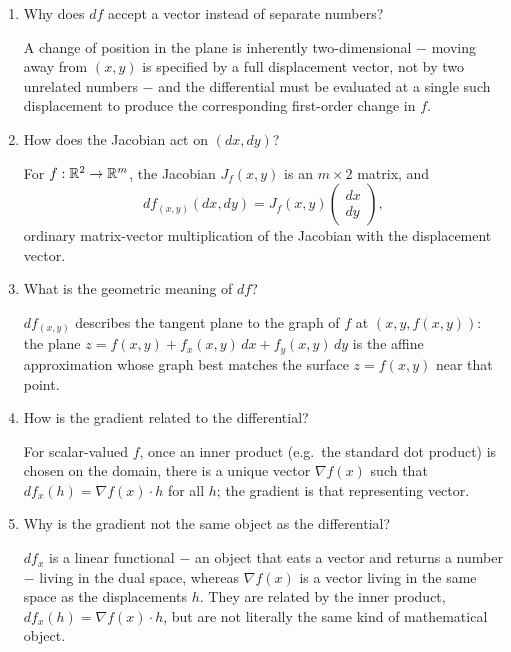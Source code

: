 \documentclass{essay}
\begin{document}
\begin{enumerate}[resume, leftmargin=*, itemsep=8pt]
\item Why does \(df\) accept a vector instead of separate numbers?
\begin{answer}
A change of position in the plane is inherently two-dimensional \(-\) moving away from \((x,y)\) is specified by a full displacement vector, not by two unrelated numbers \(-\) and the differential must be evaluated at a single such displacement to produce the corresponding first-order change in \(f\).
\end{answer}

\item How does the Jacobian act on \((dx,dy)\)?
\begin{answer}
For \(f:\mathbb{R}^2\to\mathbb{R}^m\), the Jacobian \(J_f(x,y)\) is an \(m\times2\) matrix, and
\[
df_{(x,y)}(dx,dy) = J_f(x,y)\begin{pmatrix}dx\\dy\end{pmatrix},
\]
ordinary matrix-vector multiplication of the Jacobian with the displacement vector.
\end{answer}

\item What is the geometric meaning of \(df\)?
\begin{answer}
\(df_{(x,y)}\) describes the tangent plane to the graph of \(f\) at \((x,y,f(x,y))\): the plane \(z=f(x,y)+f_x(x,y)\,dx+f_y(x,y)\,dy\) is the affine approximation whose graph best matches the surface \(z=f(x,y)\) near that point.
\end{answer}

\item How is the gradient related to the differential?
\begin{answer}
For scalar-valued \(f\), once an inner product (e.g.\ the standard dot product) is chosen on the domain, there is a unique vector \(\nabla f(x)\) such that \(df_x(h)=\nabla f(x)\cdot h\) for all \(h\); the gradient is that representing vector.
\end{answer}

\item Why is the gradient not the same object as the differential?
\begin{answer}
\(df_x\) is a linear functional \(-\) an object that eats a vector and returns a number \(-\) living in the dual space, whereas \(\nabla f(x)\) is a vector living in the same space as the displacements \(h\). They are related by the inner product, \(df_x(h)=\nabla f(x)\cdot h\), but are not literally the same kind of mathematical object.
\end{answer}


\end{enumerate}
\end{document}
